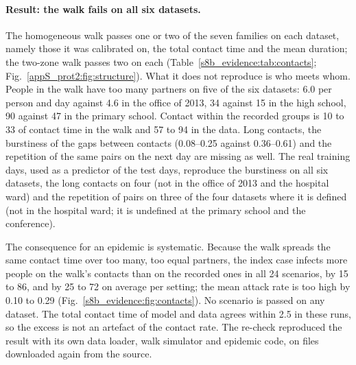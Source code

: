 \paragraph{Result: the walk fails on all six datasets.}
The homogeneous walk passes one or two of the seven families on each dataset, namely those it was calibrated
on, the total contact time and the mean duration; the two-zone walk passes two on each
(Table~\ref{s8b_evidence:tab:contacts}; Fig.~\ref{appS_prot2:fig:structure}). What it does not reproduce is
who meets whom. People in the walk have too many partners on five of the six datasets: 6.0 per person and day
against 4.6 in the office of 2013, 34 against 15 in the high school, 90 against 47 in the primary school.
Contact within the recorded groups is 10 to 33\pct{} of contact time in the walk and 57 to 94\pct{} in the
data. Long contacts, the burstiness of the gaps between contacts (0.08--0.25 against 0.36--0.61) and the
repetition of the same pairs on the next day are missing as well. The real training days, used as a predictor
of the test days, reproduce the burstiness on all six datasets, the long contacts on four (not in the office of
2013 and the hospital ward) and the repetition of pairs on three of the four datasets where it is defined (not
in the hospital ward; it is undefined at the primary school and the conference).

The consequence for an epidemic is systematic. Because the walk spreads the same contact time over too many,
too equal partners, the index case infects more people on the walk's contacts than on the recorded ones in
all 24 scenarios, by 15 to 86\pct{}, and by 25 to 72\pct{} on average per setting; the mean attack rate is too
high by 0.10 to 0.29 (Fig.~\ref{s8b_evidence:fig:contacts}). No scenario is passed on any dataset. The total
contact time of model and data agrees within 2.5\pct{} in these runs, so the excess is not an artefact of the
contact rate. The re-check reproduced the result with its own data loader, walk simulator and
epidemic code, on files downloaded again from the source.

